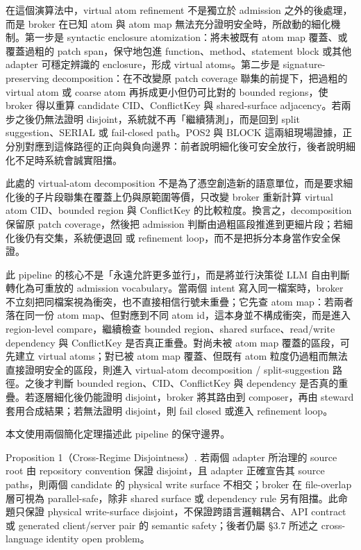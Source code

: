 \documentclass[a4paper,fontset=none]{ctexart}
\begin{document}
在這個演算法中，virtual atom refinement 不是獨立於 admission 之外的後處理，而是 broker 在已知 atom 與 atom map 無法充分證明安全時，所啟動的細化機制。第一步是 syntactic enclosure atomization：將未被既有 atom map 覆蓋、或覆蓋過粗的 patch span，保守地包進 function、method、statement block 或其他 adapter 可穩定辨識的 enclosure，形成 virtual atoms。第二步是 signature-preserving decomposition：在不改變原 patch coverage 聯集的前提下，把過粗的 virtual atom 或 coarse atom 再拆成更小但仍可比對的 bounded regions，使 broker 得以重算 candidate CID、ConflictKey 與 shared-surface adjacency。若兩步之後仍無法證明 disjoint，系統就不再「繼續猜測」，而是回到 split suggestion、SERIAL 或 fail-closed path。POS2 與 BLOCK 這兩組現場證據，正分別對應到這條路徑的正向與負向邊界：前者說明細化後可安全放行，後者說明細化不足時系統會誠實阻擋。

此處的 virtual-atom decomposition 不是為了憑空創造新的語意單位，而是要求細化後的子片段聯集在覆蓋上仍與原範圍等價，只改變 broker 重新計算 virtual atom CID、bounded region 與 ConflictKey 的比較粒度。換言之，decomposition 保留原 patch coverage，然後把 admission 判斷由過粗區段推進到更細片段；若細化後仍有交集，系統便退回 \texttt{} 或 refinement loop，而不是把拆分本身當作安全保證。

此 pipeline 的核心不是「永遠允許更多並行」，而是將並行決策從 LLM 自由判斷轉化為可重放的 admission vocabulary。當兩個 intent 寫入同一檔案時，broker 不立刻把同檔案視為衝突，也不直接相信行號未重疊；它先查 atom map：若兩者落在同一份 atom map、但對應到不同 atom id，這本身並不構成衝突，而是進入 region-level compare，繼續檢查 bounded region、shared surface、read/write dependency 與 ConflictKey 是否真正重疊。對尚未被 atom map 覆蓋的區段，可先建立 virtual atoms；對已被 atom map 覆蓋、但既有 atom 粒度仍過粗而無法直接證明安全的區段，則進入 virtual-atom decomposition / split-suggestion 路徑。之後才判斷 bounded region、CID、ConflictKey 與 dependency 是否真的重疊。若逐層細化後仍能證明 disjoint，broker 將其路由到 composer，再由 steward 套用合成結果；若無法證明 disjoint，則 fail closed 或進入 refinement loop。

本文使用兩個簡化定理描述此 pipeline 的保守邊界。

Proposition 1（Cross-Regime Disjointness）. 若兩個 adapter 所治理的 source root 由 repository convention 保證 disjoint，且 adapter 正確宣告其 source paths，則兩個 candidate 的 physical write surface 不相交；broker 在 file-overlap 層可視為 parallel-safe，除非 shared surface 或 dependency rule 另有阻擋。此命題只保證 physical write-surface disjoint，不保證跨語言邏輯耦合、API contract 或 generated client/server pair 的 semantic safety；後者仍屬 §3.7 所述之 cross-language identity open problem。
\end{document}
